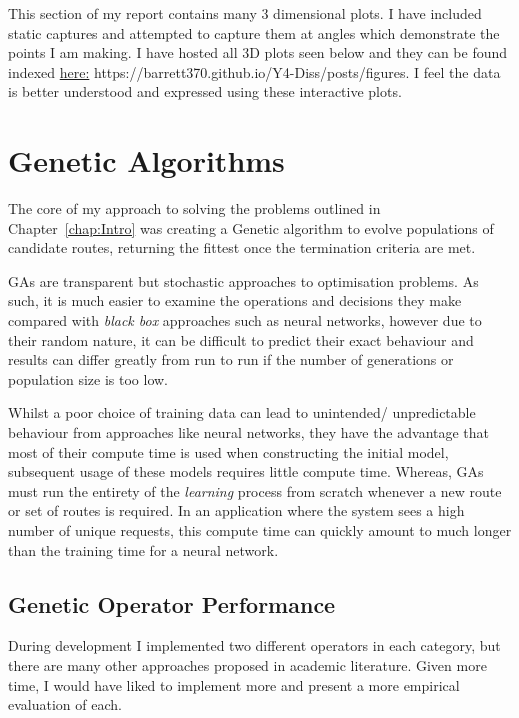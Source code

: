 This section of my report contains many 3 dimensional plots. I have included static captures and attempted to capture them at angles which demonstrate the points I am making. I have hosted all 3D plots seen below and they can be found indexed \href{https://barrett370.github.io/Y4-Diss/posts/figures}{here:} https://barrett370.github.io/Y4-Diss/posts/figures. I feel the data is better understood and expressed using these interactive plots.


\section{Genetic Algorithms}
\label{sec:eval:GAs}

The core of my approach to solving the problems outlined in Chapter~\ref{chap:Intro} was creating a Genetic algorithm to evolve populations of candidate routes, returning the fittest once the termination criteria are met.

GAs are transparent but stochastic approaches to optimisation problems. As such, it is much easier to examine the operations and decisions they make compared with \textit{black box} approaches such as neural networks, however due to their random nature, it can be difficult to predict their exact behaviour and results can differ greatly from run to run if the number of generations or population size is too low.

Whilst a poor choice of training data can lead to unintended/ unpredictable behaviour from approaches like neural networks, they have the advantage that most of their compute time is used when constructing the initial model, subsequent usage of these models requires little compute time. Whereas, GAs must run the entirety of the \textit{learning} process from scratch whenever a new route or set of routes is required. In an application where the system sees a high number of unique requests, this compute time can quickly amount to much longer than the training time for a neural network.

\subsection{Genetic Operator Performance}

During development I implemented two different operators in each category, but there are many other approaches proposed in academic literature. Given more time, I would have liked to implement more and present a more empirical evaluation of each.

